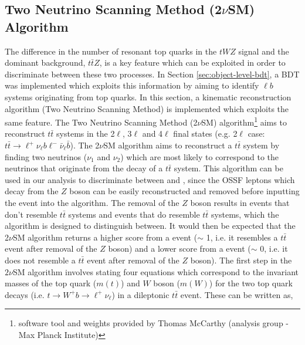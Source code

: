 \subsection{Two Neutrino Scanning Method (2$\nu$SM) Algorithm}
\label{sec:2vsm}
The difference in the number of resonant top quarks in the $tWZ$ signal and the dominant background, $t\bar{t}Z$, is a key feature which can be exploited in order to discriminate between these two processes. In Section \ref{sec:object-level-bdt}, a BDT was implemented which exploits this information by aiming to identify $\ell b$ systems originating from top quarks. In this section, a kinematic reconstruction algorithm (Two Neutrino Scanning Method) is implemented which exploits the same feature. The Two Neutrino Scanning Method (2$\nu$SM) algorithm\footnote{software tool and weights provided by Thomas McCarthy (\ttZ analysis group - Max Planck Institute)} aims to reconstruct $t\bar{t}$ systems in the 2$\ell$, 3$\ell$ and 4$\ell$ final states (e.g. 2$\ell$ case: $t\bar{t}\rightarrow \ell^{+}\nu_{\ell}b\ell^{-}\bar{\nu}_{\ell}\bar{b}$). The 2$\nu$SM algorithm aims to reconstruct a $t\bar{t}$ system by finding two neutrinos ($\nu_{1}$ and $\nu_{2}$) which are most likely to correspond to the neutrinos that originate from the decay of a $t\bar{t}$ system. This algorithm can be used in our analysis to discriminate between \tWZ and \ttZ, since the OSSF leptons which decay from the $Z$ boson can be easily reconstructed and removed before inputting the event into the algorithm. The removal of the $Z$ boson results in \tWZ events that don't resemble $t\bar{t}$ systems and \ttZ events that do resemble $t\bar{t}$ systems, which the algorithm is designed to distinguish between. It would then be expected that the 2$\nu$SM algorithm returns a higher score from a \ttZ event ($\sim$ 1, i.e. it resembles a $t\bar{t}$ event after removal of the $Z$ boson) and a lower score from a \tWZ event ($\sim$ 0, i.e. it does not resemble a $t\bar{t}$ event after removal of the $Z$ boson). The first step in the $2\nu$SM algorithm involves stating four equations which correspond to the invariant masses of the top quark ($m(t)$) and $W$ boson ($m(W)$) for the two top quark decays (i.e. $t\rightarrow W^{+}b \rightarrow \ell^{+} \nu_{\ell}$) in a dileptonic $t\bar{t}$ event. These can be written as,

